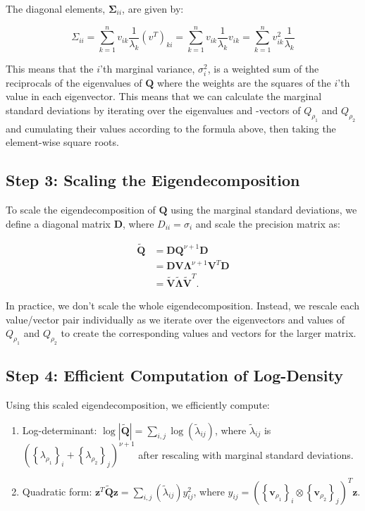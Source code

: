 \documentclass[
  12pt]{article}
\begin{document}
The diagonal elements, \(\boldsymbol \Sigma_{ii}\), are given by:

\[
\Sigma_{ii} = \sum_{k=1}^{n} v_{ik} \frac{1}{\lambda_k} (v^T)_{ki} = \sum_{k=1}^{n} v_{ik} \frac{1}{\lambda_k} v_{ik} = \sum_{k=1}^{n} v_{ik}^2 \frac{1}{\lambda_k}
\]

This means that the \(i\)'th marginal variance, \(\sigma_i^2\), is a
weighted sum of the reciprocals of the eigenvalues of \(\mathbf Q\)
where the weights are the squares of the \(i\)'th value in each
eigenvector. This means that we can calculate the marginal standard
deviations by iterating over the eigenvalues and -vectors of
\(Q_{\rho_1}\) and \(Q_{\rho_2}\) and cumulating their values according
to the formula above, then taking the element-wise square roots.

\subsection{Step 3: Scaling the
Eigendecomposition}\label{step-3-scaling-the-eigendecomposition}

To scale the eigendecomposition of \(\mathbf{Q}\) using the marginal
standard deviations, we define a diagonal matrix \(\mathbf{D}\), where
\(D_{ii} = \sigma_i\) and scale the precision matrix as:

\[
\begin{aligned}
\mathbf{\widetilde  Q} &= \mathbf{D}\mathbf{Q}^{\nu+1}\mathbf{D} \\
&= \mathbf{D}\mathbf{V}\mathbf{\Lambda}^{\nu+1}\mathbf{V}^T\mathbf{D} \\
&= \mathbf{\widetilde V}\mathbf{\widetilde\Lambda}\mathbf{\widetilde V}^T.
\end{aligned}
\]

In practice, we don't scale the whole eigendecomposition. Instead, we
rescale each value/vector pair individually as we iterate over the
eigenvectors and values of \(Q_{\rho_1}\) and \(Q_{\rho_2}\) to create
the corresponding values and vectors for the larger matrix.

\subsection{Step 4: Efficient Computation of
Log-Density}\label{step-4-efficient-computation-of-log-density}

Using this scaled eigendecomposition, we efficiently compute:

\begin{enumerate}
\def\labelenumi{\arabic{enumi}.}
\item
  Log-determinant:
  \(\log|\mathbf{\widetilde Q}| = \sum_{i,j} \log(\widetilde\lambda_{ij})\),
  where \(\widetilde\lambda_{ij}\) is
  \(\left( \left\{\lambda_{\rho_1}\right\}_i + \left\{\lambda_{\rho_2}\right\}_j \right)^{\nu+1}\)
  after rescaling with marginal standard deviations.
\item
  Quadratic form:
  \(\mathbf{z}^T\mathbf{\widetilde Q}\mathbf{z} = \sum_{i,j} (\widetilde\lambda_{ij}) y_{ij}^2\),
  where
  \(y_{ij} = \left(\left\{\mathbf{v}_{\rho_1}\right\}_i \otimes \left\{\mathbf{v}_{\rho_2}\right\}_j\right)^T\mathbf{z}\).
\end{enumerate}
\end{document}
